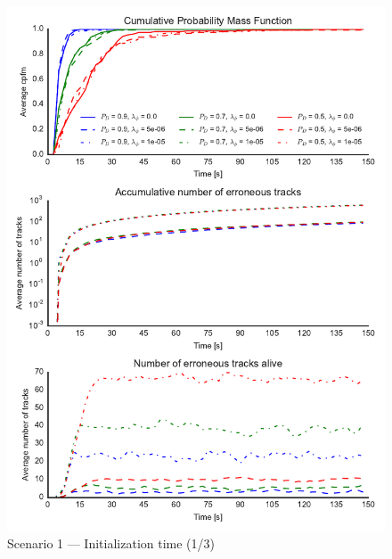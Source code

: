 \begin{figure}
\centering
\includegraphics{Figures/plots/Scenario1_Init-Time(1-3).pdf}
\caption{Scenario 1 --- Initialization time (1/3)}\label{fig:init1_time_1-3}
\end{figure}

